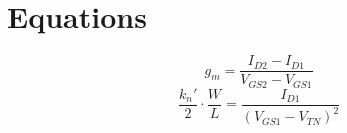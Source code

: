 \section{Equations}
\label{sec:equations}

%
\begin{equation}
  \label{eq:transconduct}
  g_m = \frac{I_{D2}-I_{D1}}{V_{GS2}-V_{GS1}}
\end{equation}
%
\begin{equation}
  \label{eq:phys}
  \frac{k_n'}{2} \cdot \frac{W}{L} = \frac{I_{D1}}{(V_{GS1} - V_{TN})^2}
\end{equation}



